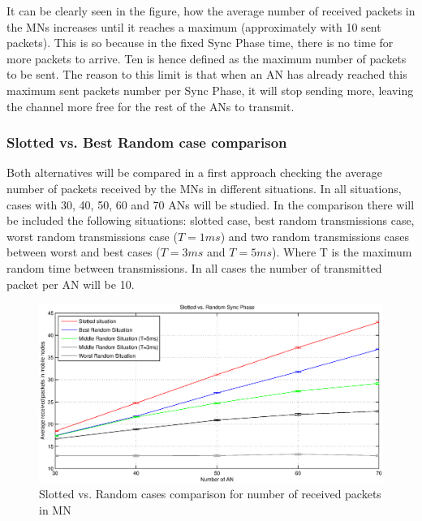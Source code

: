 It can be clearly seen in the figure, how the average number of received packets in the \acp{MN} increases until it reaches a maximum (approximately
with 10 sent packets). This is so because in the fixed Sync Phase time, there is no time for more packets to arrive. Ten is hence defined as the 
maximum number of packets to be sent. The reason to this limit is that when an \ac{AN} has already reached this maximum sent packets number per Sync Phase, 
it will stop sending more, leaving the channel more free for the rest of the \acp{AN} to transmit.

\subsubsection{Slotted vs. Best Random case comparison}

Both alternatives will be compared in a first approach checking the average number of packets received by the \acp{MN} in different situations. In 
all situations, cases with 30, 40, 50, 60 and 70 \acp{AN} will be studied. In the comparison there will be included the following situations: 
slotted case, best random transmissions case, worst random transmissions case ($T=1 ms$) and two random transmissions cases between worst and best cases
($T=3ms$ and $T=5ms$). Where T is the maximum random time between transmissions. In all cases the number of transmitted packet per \ac{AN} will be 10.

\begin{figure}[ht]
 \begin{center}
  \includegraphics[width=1\textwidth]{slottedVsRandomAverageReceivedPackets.eps}
 \end{center}
 \caption{Slotted vs. Random cases comparison for number of received packets in \ac{MN}}
 \label{fig:slottedVsRandomAverageReceivedPackets}
\end{figure}

